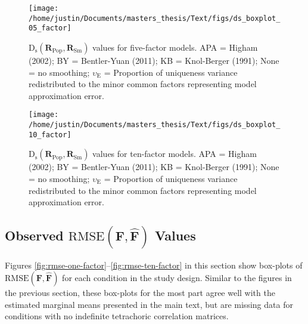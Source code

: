 \documentclass[
  english,
  man]{apa6}
\begin{document}
\begin{appendix}
\begin{figure}

{\centering \texttt{[image: /home/justin/Documents/masters\_thesis/Text/figs/ds\_boxplot\_05\_factor]} 

}

\caption{$\textrm{D}_{\textrm{s}}(\mathbf{R}_{\textrm{Pop}}, \mathbf{R}_{\textrm{Sm}})$ values for five-factor models. APA = Higham (2002); BY = Bentler-Yuan (2011); KB = Knol-Berger (1991); None = no smoothing; $\upsilon_{\textrm{E}}$ = Proportion of uniqueness variance redistributed to the minor common factors representing model approximation error.}\label{fig:ds-five-factor}
\end{figure}

\begin{figure}

{\centering \texttt{[image: /home/justin/Documents/masters\_thesis/Text/figs/ds\_boxplot\_10\_factor]} 

}

\caption{$\textrm{D}_{\textrm{s}}(\mathbf{R}_{\textrm{Pop}}, \mathbf{R}_{\textrm{Sm}})$ values for ten-factor models. APA = Higham (2002); BY = Bentler-Yuan (2011); KB = Knol-Berger (1991); None = no smoothing; $\upsilon_{\textrm{E}}$ = Proportion of uniqueness variance redistributed to the minor common factors representing model approximation error.}\label{fig:ds-ten-factor}
\end{figure}

\pagebreak

\hypertarget{observed-textrmrmsemathbff-hatmathbff-values}{%
\subsection{\texorpdfstring{Observed
\(\textrm{RMSE}(\mathbf{F}, \hat{\mathbf{F}})\)
Values}{Observed \textbackslash textrm\{RMSE\}(\textbackslash mathbf\{F\}, \textbackslash hat\{\textbackslash mathbf\{F\}\}) Values}}\label{observed-textrmrmsemathbff-hatmathbff-values}}

Figures \ref{fig:rmse-one-factor}--\ref{fig:rmse-ten-factor} in this
section show box-plots of
\(\textrm{RMSE}(\mathbf{F}, \hat{\mathbf{F}})\) for each condition in
the study design. Similar to the figures in the previous section, these
box-plots for the most part agree well with the estimated marginal means
presented in the main text, but are missing data for conditions with no
indefinite tetrachoric correlation matrices.

\begin{figure}


\end{figure}
\end{appendix}
\end{document}
